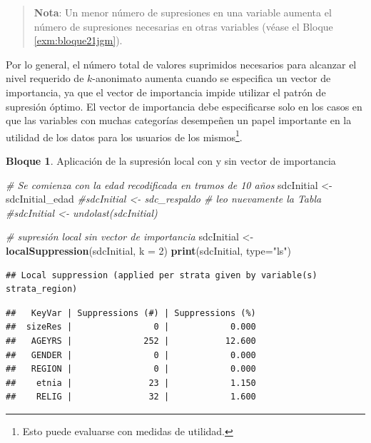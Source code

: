 \documentclass[]{book}
\newenvironment{Shaded}{\begin{snugshade}}{\end{snugshade}}
\newcommand{\CommentTok}[1]{\textcolor[rgb]{0.56,0.35,0.01}{\textit{#1}}}
\newcommand{\DataTypeTok}[1]{\textcolor[rgb]{0.13,0.29,0.53}{#1}}
\newcommand{\DecValTok}[1]{\textcolor[rgb]{0.00,0.00,0.81}{#1}}
\newcommand{\KeywordTok}[1]{\textcolor[rgb]{0.13,0.29,0.53}{\textbf{#1}}}
\newcommand{\NormalTok}[1]{#1}
\newcommand{\StringTok}[1]{\textcolor[rgb]{0.31,0.60,0.02}{#1}}
\theoremstyle{definition}
\theoremstyle{definition}
\newtheorem{example}{Bloque}[chapter]
\theoremstyle{definition}
\theoremstyle{definition}
\theoremstyle{remark}
\begin{document}
\begin{quote}
\textbf{Nota}: Un menor número de supresiones en una variable aumenta el número de supresiones necesarias en otras variables (véase el Bloque \ref{exm:bloque21jgm}).
\end{quote}

Por lo general, el número total de valores suprimidos necesarios para alcanzar el nivel requerido de \(k\)-anonimato aumenta cuando se especifica un vector de importancia, ya que el vector de importancia impide utilizar el patrón de supresión óptimo. El vector de importancia debe especificarse solo en los casos en que las variables con muchas categorías desempeñen un papel importante en la utilidad de los datos para los usuarios de los mismos\footnote{Esto puede evaluarse con medidas de utilidad.}.

\begin{example}
\protect\hypertarget{exm:bloque21jgm}{}{\label{exm:bloque21jgm} }Aplicación de la supresión local con y sin vector de importancia
\end{example}

\begin{Shaded}
\begin{Highlighting}[]
\CommentTok{# Se comienza con la edad recodificada en tramos de 10 años}
\NormalTok{sdcInitial <-}\StringTok{ }\NormalTok{sdcInitial_edad}
\CommentTok{#sdcInitial <- sdc_respaldo # leo nuevamente la Tabla}
\CommentTok{#sdcInitial <- undolast(sdcInitial)}

\CommentTok{# supresión local sin vector de importancia}
\NormalTok{sdcInitial <-}\StringTok{ }\KeywordTok{localSuppression}\NormalTok{(sdcInitial, }\DataTypeTok{k =} \DecValTok{2}\NormalTok{)}
\KeywordTok{print}\NormalTok{(sdcInitial, }\DataTypeTok{type=}\StringTok{"ls"}\NormalTok{)}
\end{Highlighting}
\end{Shaded}

\begin{verbatim}
## Local suppression (applied per strata given by variable(s) strata_region)
\end{verbatim}

\begin{verbatim}
##   KeyVar | Suppressions (#) | Suppressions (%)
##  sizeRes |                0 |            0.000
##   AGEYRS |              252 |           12.600
##   GENDER |                0 |            0.000
##   REGION |                0 |            0.000
##    etnia |               23 |            1.150
##    RELIG |               32 |            1.600
\end{verbatim}
\end{document}
